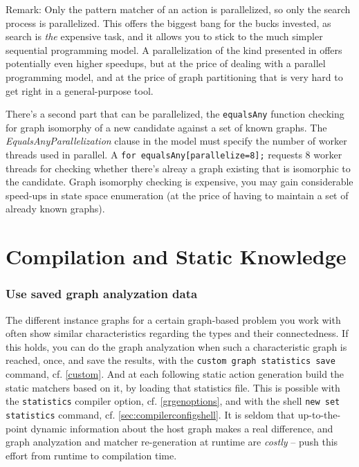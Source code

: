 Remark: Only the pattern matcher of an action is parallelized, so only the search process is parallelized.
This offers the biggest bang for the bucks invested, as search is \emph{the} expensive task, and it allows you to stick to the much simpler sequential programming model.
A parallelization of the kind presented in \cite{ParGraErs} offers potentially even higher speedups, but at the price of dealing with a parallel programming model, and at the price of graph partitioning that is very hard to get right in a general-purpose tool.

There's a second part that can be parallelized, the \texttt{equalsAny} function checking for graph isomorphy of a new candidate against a set of known graphs.
The \emph{EqualsAnyParallelization} clause in the model must specify the number of worker threads used in parallel.
A \verb#for equalsAny[parallelize=8];# requests 8 worker threads for checking whether there's alreay a graph existing that is isomorphic to the candidate.
Graph isomorphy checking is expensive, you may gain considerable speed-ups in state space enumeration (at the price of having to maintain a set of already known graphs).

\section{Compilation and Static Knowledge}

\subsubsection*{Use saved graph analyzation data}
The different instance graphs for a certain graph-based problem you work with often show similar characteristics regarding the types and their connectedness.
If this holds, you can do the graph analyzation when such a characteristic graph is reached, once, and save the results,
with the \texttt{custom graph statistics save} command, cf. \ref{custom}.
And at each following static action generation build the static matchers based on it, by loading that statistics file. 
This is possible with the \texttt{statistics} compiler option, cf. \ref{grgenoptions},
and with the shell \texttt{new set statistics} command, cf. \ref{sec:compilerconfigshell}. 
It is seldom that up-to-the-point dynamic information about the host graph makes a real difference,
and graph analyzation and matcher re-generation at runtime are \emph{costly} -- push this effort from runtime to compilation time.

